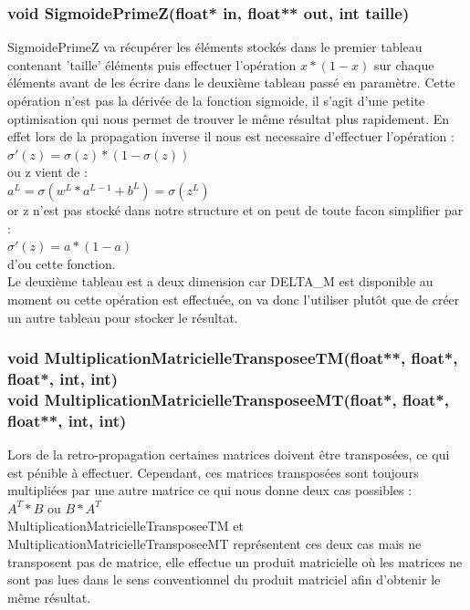 \documentclass{article}
\begin{document}
			\subsubsection{\textcolor{myblue}{\textbf{void}} SigmoidePrimeZ(\textcolor{myblue}{\textbf{float*}} in, \textcolor{myblue}{\textbf{float**}} out, \textcolor{myblue}{\textbf{int}} taille)}
			SigmoidePrimeZ va récupérer les éléments stockés dans le premier tableau contenant 'taille' éléments puis effectuer l'opération $x*(1-x)$ sur chaque éléments avant de les écrire dans le deuxième tableau passé en paramètre. Cette opération n'est pas la dérivée de la fonction sigmoide, il s'agit d'une petite optimisation qui nous permet de trouver le même résultat plus rapidement. En effet lors de la propagation inverse il nous est necessaire d'effectuer l'opération : \\$\sigma'(z) = \sigma(z)*(1-\sigma(z))$\\ ou z vient de : \\$a^L = \sigma(w^L*a^{L-1}+b^L) = \sigma(z^L)$\\ or z n'est pas stocké dans notre structure et on peut de toute facon simplifier par :\\$\sigma'(z)=a*(1-a)$\\ d'ou cette fonction.\\
			Le deuxième tableau est a deux dimension car DELTA\_M est disponible au moment ou cette opération est effectuée, on va donc l'utiliser plutôt que de créer un autre tableau pour stocker le résultat.
			
			\subsubsection{\textcolor{myblue}{\textbf{void}} MultiplicationMatricielleTransposeeTM(\textcolor{myblue}{\textbf{float**}},  \textcolor{myblue}{\textbf{float*}},  \textcolor{myblue}{\textbf{float*}},  \textcolor{myblue}{\textbf{int}},  \textcolor{myblue}{\textbf{int}})\\
			\textcolor{myblue}{\textbf{void}} MultiplicationMatricielleTransposeeMT(\textcolor{myblue}{\textbf{float*}},  \textcolor{myblue}{\textbf{float*}},  \textcolor{myblue}{\textbf{float**}},  \textcolor{myblue}{\textbf{int}},  \textcolor{myblue}{\textbf{int}})}
				Lors de la retro-propagation certaines matrices doivent être transposées, ce qui est pénible à effectuer. Cependant, ces matrices transposées sont toujours multipliées par une autre matrice ce qui nous donne deux cas possibles : \\$A^T*B$ ou $B*A^T$\\MultiplicationMatricielleTransposeeTM et MultiplicationMatricielleTransposeeMT représentent ces deux cas mais ne transposent pas de matrice, elle effectue un produit matricielle où les matrices ne sont pas lues dans le sens conventionnel du produit matriciel afin d'obtenir le même résultat.
				
\end{document}
